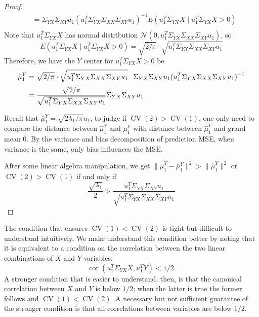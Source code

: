 \documentclass[12pt]{article}
\newcommand{\CV}{\operatorname{CV}}
\DeclareMathOperator*{\cor}{cor}
\newcommand{\T}{T}
\begin{document}
\begin{proof}
\begin{align}
 		      & =  \Sigma_{YX}\Sigma_{XY}u_1 (u^T_1\Sigma_{YX} \Sigma_{XX} \Sigma_{XY} u_1)^{-1} E(u^T_1\Sigma_{YX}X \mid u^T_1\Sigma_{YX}X>0) \\ \nonumber
\end{align}
Note that $u^T_1\Sigma_{YX}X$ has normal distribution $\mathcal{N} \left( 0, u^T_1\Sigma_{YX} \Sigma_{XX} \Sigma_{XY} u_1\right)$, so
\[
E(u^T_1\Sigma_{YX}X \mid u^T_1\Sigma_{YX}X>0) = \sqrt{2/\pi}\cdot\sqrt{u^T_1\Sigma_{YX} \Sigma_{XX} \Sigma_{XY} u_1}
\]
Therefore, we have the $Y$ center for $u^T_1\Sigma_{YX}X>0$ be
\begin{align*}
\hat{\mu}^Y_1 &= \sqrt{2/\pi}\cdot\sqrt{u^T_1\Sigma_{YX} \Sigma_{XX} \Sigma_{XY} u_1} \hspace{0.1in} \Sigma_{YX}\Sigma_{XY}u_1 (u^T_1\Sigma_{YX} \Sigma_{XX} \Sigma_{XY} u_1)^{-1} \\
&=\frac{\sqrt{2/\pi}}{\sqrt{u^T_1\Sigma_{YX} \Sigma_{XX} \Sigma_{XY} u_1}} \Sigma_{YX}\Sigma_{XY}u_1
\end{align*} 
 
Recall that $\bar{\mu}^Y_1 =\sqrt{2 \lambda_1/\pi}u_1$, to judge if $\CV(2) >
\CV(1)$, one only need to compare the distance between  $\hat{\mu}^Y_1$  and
$\bar{\mu}^Y_1$ with distance between  $\hat{\mu}^Y_1$ and grand mean $0$. By
the variance and bias decomposition of prediction MSE, when variance is the
same, only bias influences the MSE. 

After some linear algebra manipulation, we get
$\|\hat{\mu}^Y_1 - \bar{\mu}^Y_1\|^2 > \|\hat{\mu}^Y_1\|^2$ or $\CV(2) >
\CV(1)$ if and only if
\[
 \frac{\sqrt{\lambda_1}}{2} > \frac{u^T_1\Sigma_{YX}\Sigma_{XY}u_1}{\sqrt{u^T_1\Sigma_{YX} \Sigma_{XX} \Sigma_{XY} u_1}} 
\]
\end{proof}


The condition that ensures $\CV(1) < \CV(2)$ is tight but difficult to
understand intuitively. We make understand this condition better by
noting that it is equivalent to a condition on the correlation between the
two linear combinations of $X$ and $Y$ variables:
\begin{equation}\label{eqn:clust-anyd}
    \cor(u_1^\T \Sigma_{YX} X, u_1^\T Y) < 1/2.
\end{equation}
A stronger condition that is easier to understand, then, is that the canonical
correlation between $X$ and $Y$ is below $1/2$; when the latter is true the
former follows and $\CV(1) < \CV(2)$. A necessary but not sufficient
guarantee of the stronger condition is that all correlations between variables
are below $1/2$.
\end{document}
